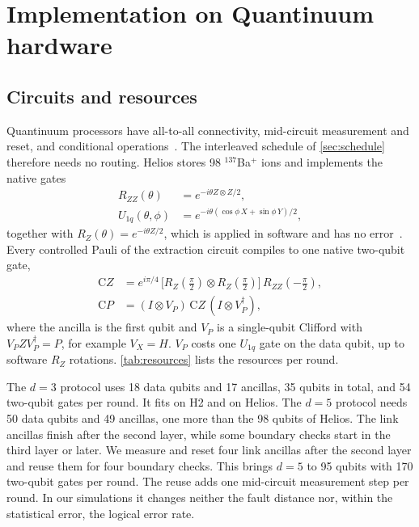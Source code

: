 \section{Implementation on Quantinuum hardware}
\label{sec:hardware}

\subsection{Circuits and resources}

Quantinuum processors have all-to-all connectivity, mid-circuit measurement and reset, and conditional operations~\cite{moses2023,ransford2026}. The interleaved schedule of \autoref{sec:schedule} therefore needs no routing. Helios stores 98 $^{137}$Ba$^+$ ions and implements the native gates
\begin{align}
  R_{ZZ}(\theta)&=e^{-i\theta Z\otimes Z/2},\nonumber\\
  U_{1q}(\theta,\phi)&=e^{-i\theta(\cos\phi\,X+\sin\phi\,Y)/2},
  \label{eq:native}
\end{align}
together with $R_Z(\theta)=e^{-i\theta Z/2}$, which is applied in software and has no error~\cite{ransford2026}. Every controlled Pauli of the extraction circuit compiles to one native two-qubit gate,
\begin{align}
  \mathrm{C}Z&=e^{i\pi/4}\,\big[R_Z(\tfrac{\pi}{2})\otimes R_Z(\tfrac{\pi}{2})\big]\,R_{ZZ}(-\tfrac{\pi}{2}),\nonumber\\
  \mathrm{C}P&=(I\otimes V_P)\,\mathrm{C}Z\,(I\otimes V_P^\dagger),
  \label{eq:compile}
\end{align}
where the ancilla is the first qubit and $V_P$ is a single-qubit Clifford with $V_PZV_P^\dagger=P$, for example $V_X=H$. $V_P$ costs one $U_{1q}$ gate on the data qubit, up to software $R_Z$ rotations. \autoref{tab:resources} lists the resources per round.

The $d=3$ protocol uses 18 data qubits and 17 ancillas, 35 qubits in total, and 54 two-qubit gates per round. It fits on H2 and on Helios. The $d=5$ protocol needs 50 data qubits and 49 ancillas, one more than the 98 qubits of Helios. The link ancillas finish after the second layer, while some boundary checks start in the third layer or later. We measure and reset four link ancillas after the second layer and reuse them for four boundary checks. This brings $d=5$ to 95 qubits with 170 two-qubit gates per round. The reuse adds one mid-circuit measurement step per round. In our simulations it changes neither the fault distance nor, within the statistical error, the logical error rate.

